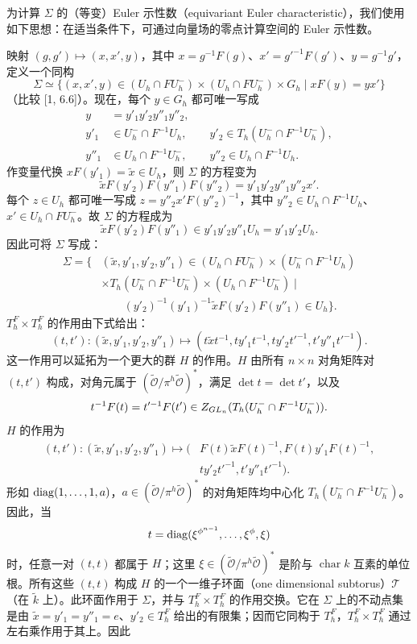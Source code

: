 为计算 $\Sigma$ 的（等变）Euler 示性数（equivariant Euler characteristic），我们使用如下思想：在适当条件下，可通过向量场的零点计算空间的 Euler 示性数。

映射 $(g,g')\mapsto(x,x',y)$，其中 $x=g^{-1}F(g)$、$x'=g'^{-1}F(g')$、$y=g^{-1}g'$，定义一个同构
\[
\Sigma\simeq\{(x,x',y)\in(U_h\cap FU_h^-)\times(U_h\cap FU_h^-)\times G_h\mid xF(y)=yx'\}
\]
（比较 [1, 6.6]）。现在，每个 $y\in G_h$ 都可唯一写成
\[
\begin{aligned}
y&=y'_1y'_2y''_1y''_2,\\
y'_1&\in U_h^-\cap F^{-1}U_h,\qquad y'_2\in T_h(U_h^-\cap F^{-1}U_h^-),\\
y''_1&\in U_h\cap F^{-1}U_h^-,\qquad y''_2\in U_h\cap F^{-1}U_h.
\end{aligned}
\]
作变量代换 $xF(y'_1)=\widetilde x\in U_h$，则 $\Sigma$ 的方程变为
\[
\widetilde xF(y'_2)F(y''_1)F(y''_2)=y'_1y'_2y''_1y''_2x'.
\]
每个 $z\in U_h$ 都可唯一写成 $z=y''_2x'F(y''_2)^{-1}$，其中 $y''_2\in U_h\cap F^{-1}U_h$、$x'\in U_h\cap FU_h^-$。故 $\Sigma$ 的方程成为
\[
\widetilde xF(y'_2)F(y''_1)\in y'_1y'_2y''_1U_h=y'_1y'_2U_h.
\]
因此可将 $\Sigma$ 写成：
\[
\begin{aligned}
\Sigma=\{&(\widetilde x,y'_1,y'_2,y''_1)\in(U_h\cap FU_h^-)\times(U_h^-\cap F^{-1}U_h)\\
&\times T_h(U_h^-\cap F^{-1}U_h^-)\times(U_h\cap F^{-1}U_h^-)\mid\\
&\hspace{2em}(y'_2)^{-1}(y'_1)^{-1}\widetilde xF(y'_2)F(y''_1)\in U_h\}.
\end{aligned}
\]
$T_h^F\times T_h^F$ 的作用由下式给出：
\[
(t,t'):(\widetilde x,y'_1,y'_2,y''_1)\longmapsto
(t\widetilde xt^{-1},ty'_1t^{-1},ty'_2t'^{-1},t'y''_1t'^{-1}).
\]
这一作用可以延拓为一个更大的群 $H$ 的作用。$H$ 由所有 $n\times n$ 对角矩阵对 $(t,t')$ 构成，对角元属于 $(\widetilde{\mathcal O}/\pi^h\widetilde{\mathcal O})^*$，满足 $\det t=\det t'$，以及
\[
t^{-1}F(t)=t'^{-1}F(t')\in Z_{GL_n}(T_h(U_h^-\cap F^{-1}U_h^-)).
\]
$H$ 的作用为
\[
\begin{aligned}
(t,t'):(\widetilde x,y'_1,y'_2,y''_1)\longmapsto
(&F(t)\widetilde xF(t)^{-1},F(t)y'_1F(t)^{-1},\\
&ty'_2t'^{-1},t'y''_1t'^{-1}).
\end{aligned}
\]
形如 $\operatorname{diag}(1,\ldots,1,a)$，$a\in(\widetilde{\mathcal O}/\pi^h\widetilde{\mathcal O})^*$ 的对角矩阵均中心化 $T_h(U_h^-\cap F^{-1}U_h^-)$。因此，当
\[
t=\operatorname{diag}(\xi^{\phi^{n-1}},\ldots,\xi^\phi,\xi)
\]
时，任意一对 $(t,t)$ 都属于 $H$；这里 $\xi\in(\widetilde{\mathcal O}/\pi^h\widetilde{\mathcal O})^*$ 是阶与 $\operatorname{char}k$ 互素的单位根。所有这些 $(t,t)$ 构成 $H$ 的一个一维子环面（one dimensional subtorus）$\mathscr T$（在 $\widetilde k$ 上）。此环面作用于 $\Sigma$，并与 $T_h^F\times T_h^F$ 的作用交换。它在 $\Sigma$ 上的不动点集是由 $\widetilde x=y'_1=y''_1=e$、$y'_2\in T_h^F$ 给出的有限集；因而它同构于 $T_h^F$，$T_h^F\times T_h^F$ 通过左右乘作用于其上。因此
